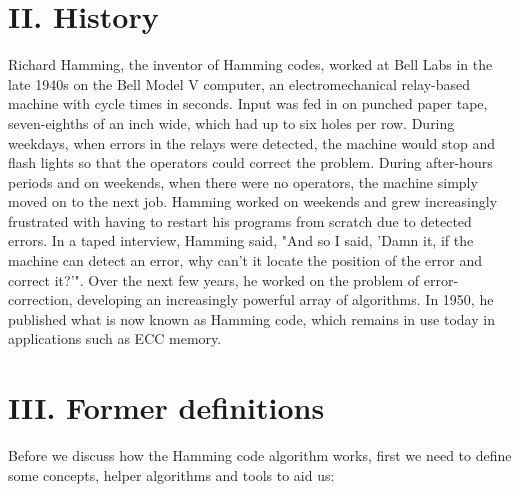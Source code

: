 \documentclass[11pt]{article}
\begin{document}
\section*{II. History}
Richard Hamming, the inventor of Hamming codes, worked at Bell Labs in the late 1940s on the Bell Model V computer, an electromechanical relay-based machine with cycle times in seconds. Input was fed in on punched paper tape, seven-eighths of an inch wide, which had up to six holes per row. During weekdays, when errors in the relays were detected, the machine would stop and flash lights so that the operators could correct the problem. During after-hours periods and on weekends, when there were no operators, the machine simply moved on to the next job.
\newline
Hamming worked on weekends and grew increasingly frustrated with having to restart his programs from scratch due to detected errors. In a taped interview, Hamming said, "And so I said, 'Damn it, if the machine can detect an error, why can't it locate the position of the error and correct it?'". Over the next few years, he worked on the problem of error-correction, developing an increasingly powerful array of algorithms. In 1950, he published what is now known as Hamming code, which remains in use today in applications such as ECC memory.

\section*{III. Former definitions}
Before we discuss how the Hamming code algorithm works, first we need to define some concepts, helper algorithms and tools to aid us:
\end{document}
